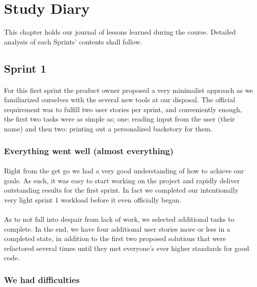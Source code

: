 \section{Study Diary}

This chapter holds our journal of lessons learned during the course. Detailed analysis of each Sprints' contents shall follow.

\subsection{Sprint 1}

\paragraph{} For this first sprint the product owner proposed a very minimalist approach as we familiarized ourselves with the several new tools at our disposal. The official requirement was to fulfill two user stories per sprint, and conveniently enough, the first two tasks were as simple as; one: reading input from the user (their name) and then two: printing out a personalized backstory for them.

\subsubsection{Everything went well (almost everything)}

\paragraph{} Right from the get go we had a very good understanding of how to achieve our goals. As such, it was easy to start working on the project and rapidly deliver outstanding results for the first sprint. In fact we completed our intentionally very light sprint 1 workload before it even officially began.

\paragraph{} As to not fall into despair from lack of work, we selected additional tasks to complete. In the end, we have four additional user stories more or less in a completed state, in addition to the first two proposed solutions that were refactored several times until they met everyone's ever higher standards for good code.

\subsubsection{We had difficulties}

